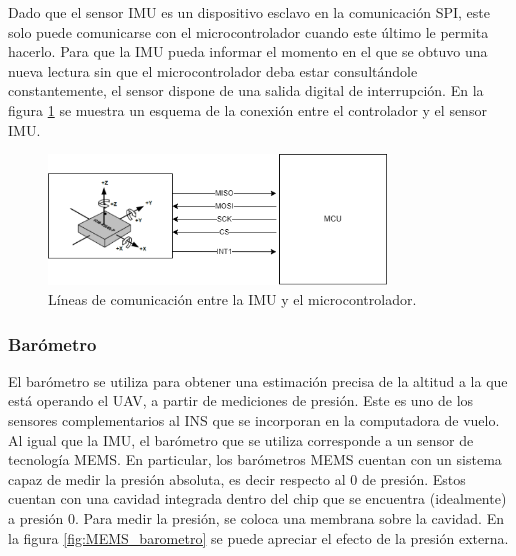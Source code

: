 Dado que el sensor IMU es un dispositivo esclavo en la comunicación SPI, este solo puede comunicarse con el microcontrolador cuando este último le permita hacerlo. Para que la IMU pueda informar el momento en el que se obtuvo una nueva lectura sin que el microcontrolador deba estar consultándole constantemente, el sensor dispone de una salida digital de interrupción. En la figura \ref{fig:IMU_SPI} se muestra un esquema de la conexión entre el controlador y el sensor IMU.



\begin{figure}[htb]
    \centering
    \includegraphics[width=0.8\textwidth]{img/IMU_SPI.png}
    \caption{Líneas de comunicación entre la IMU y el microcontrolador.}
    \label{fig:IMU_SPI}    
\end{figure}

\subsubsection{Barómetro}

El barómetro se utiliza para obtener una estimación precisa de la altitud a la que está operando el UAV, a partir de mediciones de presión. Este es uno de los sensores complementarios al INS que se incorporan en la computadora de vuelo. Al igual que la IMU, el barómetro que se utiliza corresponde a un sensor de tecnología MEMS. En particular, los barómetros MEMS cuentan con un sistema capaz de medir la presión absoluta, es decir respecto al 0 de presión. Estos cuentan con una cavidad integrada dentro del chip que se encuentra (idealmente) a presión 0. %
Para medir la presión, se coloca una membrana sobre la cavidad. En la figura \ref{fig:MEMS_barometro} se puede apreciar el efecto de la presión externa. 

